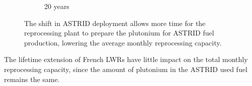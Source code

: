 \begin{figure}[htbp]
\begin{subfigure}[b]{0.4\textwidth}
        \caption{20 years}
    \end{subfigure}
    \caption{The shift in \gls{ASTRID} deployment allows more time for the reprocessing
             plant to prepare the plutonium for \gls{ASTRID} fuel production, lowering
             the average monthly reprocessing capacity.}
    \label{fig:ext_hor}
\end{figure}
\fi

The lifetime extension of French \glspl{LWR} have little impact on the total
monthly reprocessing capacity, since the amount of plutonium in the \gls{ASTRID} used fuel
remains the same.

